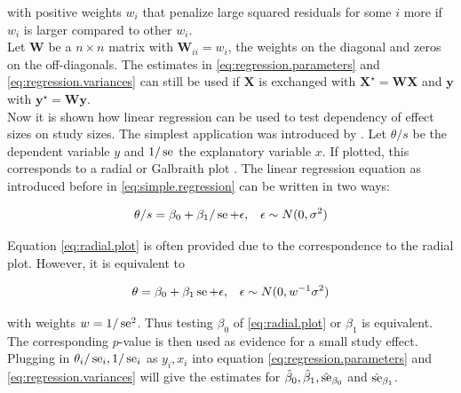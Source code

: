 \documentclass[11pt,a4paper,twoside]{book}\usepackage[]{graphicx}\usepackage[]{color}
\begin{document}
with positive weights $w_i$ that penalize large squared residuals for some $i$ more if $w_i$ is larger compared to other $w_i$. \\
Let $\mathbf{W}$ be a $n \times n$ matrix with $\mathbf{W}_{ii} = w_i$, the weights on the diagonal and zeros on the off-diagonals. The estimates in \ref{eq:regression.parameters} and \ref{eq:regression.variances} can still be used if $\mathbf{X}$ is exchanged with $\mathbf{X}^\star =  \mathbf{W} \mathbf{X}$ and $\mathbf{y}$ with $\mathbf{y}^\star = \mathbf{W} \mathbf{y}$. \label{weighted.regression} \\
Now it is shown how linear regression can be used to test dependency of effect sizes on study sizes. The simplest application was introduced by \citet{Egger}.
Let $\theta/s$ be the dependent variable $y$ and $1/\operatorname{se}$ the explanatory variable $x$. If plotted, this corresponds to a radial or Galbraith plot \citep{galbraith}. The linear regression equation as introduced before in \ref{eq:simple.regression} can be written in two ways:

\begin{align}
\theta/s &= \beta_0 + \beta_1/\operatorname{se} + \epsilon, & \epsilon \sim N(0, \sigma^2) \label{eq:radial.plot} 
\end{align}

Equation \eqref{eq:radial.plot} is often provided due to the correspondence to the radial plot. However, it is equivalent to

\begin{align}
\theta &= \beta_0 + \beta_1 \operatorname{se} + \epsilon, & \epsilon \sim N(0, w^{-1}\sigma^2) \label{eq:egger.plot}
\end{align}

with weights $w = 1/\operatorname{se}^2$. Thus testing $\beta_0$ of \ref{eq:radial.plot} or $\beta_1$ is equivalent. The corresponding $p$-value is then used as evidence for a small study effect. Plugging in  $\theta_i/\operatorname{se}_i, 1/\operatorname{se}_i$ as $y_i, x_i$ into equation \ref{eq:regression.parameters} and \ref{eq:regression.variances} will give the estimates for $\hat{\beta}_0, \hat{\beta}_1,\hat{\operatorname{se}}_{\beta_0}$ and $\hat{\operatorname{se}}_{\beta_1}$.

\end{document}

